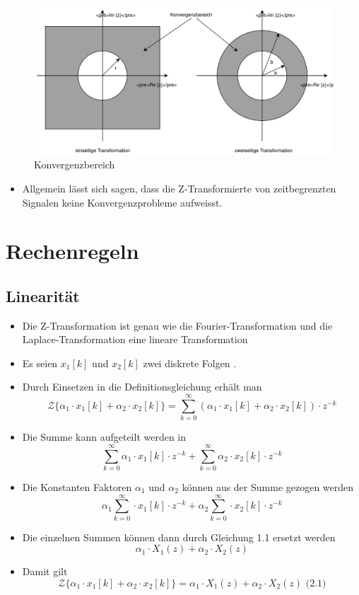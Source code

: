 \documentclass[11pt]{article}
\makeatletter
\def\maxwidth{\ifdim\Gin@nat@width>\linewidth\linewidth
    \else\Gin@nat@width\fi}
\let\Oldincludegraphics\includegraphics
\renewcommand{\includegraphics}[1]{\Oldincludegraphics[width=.8\maxwidth]{#1}}
\providecommand{\tightlist}{%
      \setlength{\itemsep}{0pt}\setlength{\parskip}{0pt}}
\makeatother
\begin{document}
\begin{figure}
\centering
\includegraphics{Konvergenzbereich.svg}
\caption{Konvergenzbereich}
\end{figure}

\begin{itemize}
\tightlist
\item
  Allgemein lässt sich sagen, dass die Z-Transformierte von
  zeitbegrenzten Signalen keine Konvergenzprobleme aufweisst.
\end{itemize}

    \section{Rechenregeln}\label{rechenregeln}

\subsection{Linearität}\label{linearituxe4t}

\begin{itemize}
\item
  Die Z-Transformation ist genau wie die Fourier-Transformation und die
  Laplace-Transformation eine lineare Transformation
\item
  Es seien \(x_1[k]\) und \(x_2[k]\) zwei diskrete Folgen .
\item
  Durch Einsetzen in die Definitionsgleichung erhält man
  \[\mathcal{Z}\{\alpha_1 \cdot x_1[k] + \alpha_2 \cdot x_2[k]\} =  \sum_{k=0}^\infty (\alpha_1 \cdot x_1[k] + \alpha_2 \cdot x_2[k]) \cdot z^{-k}\]
\item
  Die Summe kann aufgeteilt werden in
  \[\sum_{k=0}^\infty \alpha_1 \cdot x_1[k] \cdot z^{-k} + \sum_{k=0}^\infty \alpha_2 \cdot x_2[k] \cdot z^{-k}\]
\item
  Die Konstanten Faktoren \(\alpha_1\) und \(\alpha_2\) können aus der
  Summe gezogen werden
  \[\alpha_1 \sum_{k=0}^\infty \cdot x_1[k] \cdot z^{-k} + \alpha_2 \sum_{k=0}^\infty \cdot x_2[k] \cdot z^{-k}\]
\item
  Die einzelnen Summen können dann durch Gleichung 1.1 ersetzt werden
  \[\alpha_1 \cdot X_1(z) + \alpha_2 \cdot X_2(z)\]
\item
  Damit gilt
  \[\mathcal{Z}\{\alpha_1 \cdot x_1[k] + \alpha_2 \cdot x_2[k]\} = \alpha_1 \cdot X_1(z) + \alpha_2 \cdot X_2(z)\textrm{  (2.1)}\]
\end{itemize}
\end{document}
